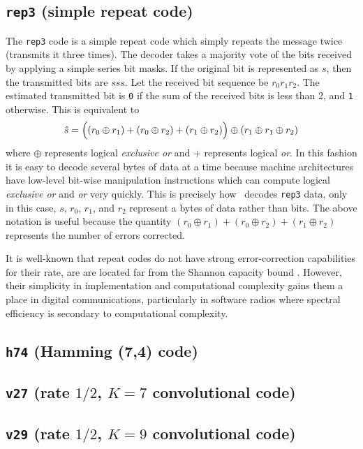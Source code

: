 \subsection{{\tt rep3} (simple repeat code)}
\label{module:fec:rep3}
The {\tt rep3} code is a simple repeat code which simply repeats the message
twice (transmits it three times).
The decoder takes a majority vote of the bits received by applying a simple
series bit masks.
If the original bit is represented as $s$, then the transmitted bits are
$s s s$.
Let the received bit sequence be $r_0 r_1 r_2$.
The estimated transmitted bit is {\tt 0} if the sum of the received bits is
less than 2, and {\tt 1} otherwise.
This is equivalent to
\[
    \hat{s} =   \Bigl(
                (r_0 \oplus r_1) + 
                (r_0 \oplus r_2) + 
                (r_1 \oplus r_2) 
                \Bigr)
                \oplus
                (r_1 \oplus r_1 \oplus r_2)
\]
where $\oplus$ represents logical {\it exclusive or} and $+$ represents
logical {\it or}.
In this fashion it is easy to decode several bytes of data at a time because
machine architectures have low-level bit-wise manipulation instructions which
can compute logical {\it exclusive or} and {\it or} very quickly.
This is precisely how \liquid\ decodes {\tt rep3} data, only in this case,
$s$, $r_0$, $r_1$, and $r_2$ represent a bytes of data rather than bits.
The above notation is useful because the quantity
$(r_0 \oplus r_1) + (r_0 \oplus r_2) + (r_1 \oplus r_2)$
represents the number of errors corrected.

It is well-known that repeat codes do not have strong error-correction
capabilities for their rate, are are located far from the Shannon capacity
bound \cite{Proakis:2001}.
However, their simplicity in implementation and computational complexity gains
them a place in digital communications, particularly in software radios where
spectral efficiency is secondary to computational complexity.

\subsection{{\tt h74} (Hamming (7,4) code)}
\label{module:fec:h74}

\subsection{{\tt v27} (rate $1/2$, $K=7$ convolutional code)}
\label{module:fec:v27}

\subsection{{\tt v29} (rate $1/2$, $K=9$ convolutional code)}
\label{module:fec:v29}

